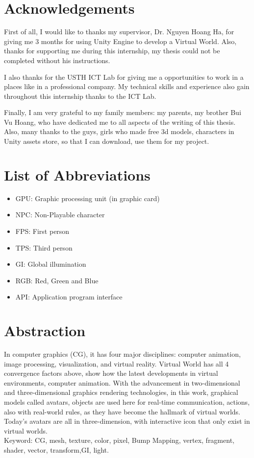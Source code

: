 \documentclass[a4paper, 13pt]{extarticle}
\begin{document}
\newpage
\setcounter{secnumdepth}{4}
\setcounter{tocdepth}{4}
\tableofcontents
\setcounter{page}{2}
\newpage

\newpage
\section*{\color{cyan}\Large Acknowledgements}

First of all, I would like to thanks my supervisor, Dr. Nguyen Hoang Ha, for giving me 3 months for using  Unity Engine to develop a Virtual World. Also, thanks for supporting me during this internship, my thesis could not be completed without his instructions. 

I also thanks for the USTH ICT Lab for giving me a opportunities to work in a places like in a professional company. My technical skills and experience also gain throughout this internship thanks to the ICT Lab.

Finally, I am very grateful to my family members: my parents, my brother Bui Vu Hoang, who have dedicated me to all aspects of the writing of this thesis. Also, many thanks to the guys, girls who made free 3d models, characters in Unity assets store, so that I can download, use them for my project. 
\newpage
 
 \newpage
 \appendix
  \renewcommand{\thesubsection}{\Alph{section}}
 \renewcommand{\thesubsection}{\arabic{subsection}}
\section*{\Large List of Abbreviations} 
\begin{itemize}
	\item GPU: Graphic processing unit (in graphic card)
	\item NPC: Non-Playable character
	\item FPS: First person
	\item TPS: Third person
	\item GI: Global illumination	
	\item RGB: Red, Green and Blue
	\item API: Application program interface 
\end{itemize}
\newpage
\section{\Large Abstraction}
 In computer graphics (CG), it has four major disciplines: computer animation, image processing, visualization, and virtual reality. Virtual World has all 4 convergence factors above, show how the latest developments in virtual environments, computer animation. With the advancement in two-dimensional and three-dimensional graphics rendering technologies, in this work, graphical models called avatars, objects are used here for real-time communication, actions, also with real-world rules, as they have become the hallmark of virtual worlds. Today's avatars	are all in three-dimension, with interactive icon that only exist in virtual worlds. \\
 Keyword: CG, mesh, texture, color, pixel, Bump Mapping, vertex, fragment, shader, vector, transform,GI, light.
 
\end{document}
